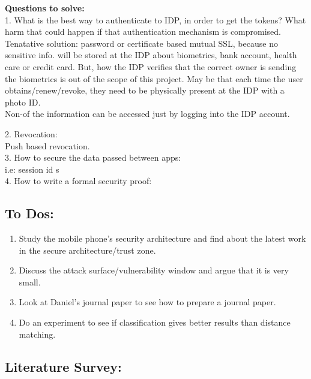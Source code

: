 \documentclass[11pt]{article}
\begin{document}
\textbf{Questions to solve:}\\
 1. What is the best way to authenticate to IDP, in order to get the tokens? What harm that could happen if that authentication mechanism is 
compromised.\\
Tenatative solution: password or certificate based mutual SSL, because no sensitive info. will be stored at the IDP about biometrics, bank account, 
health care or credit card. But, how the IDP verifies that the correct owner is sending the biometrics is out of the scope of this project.
May be that each time the user obtains/renew/revoke, they need to be physically present at the IDP with a photo ID. \\

Non-of the information can be accessed just by logging into the IDP account.

2. Revocation:\\
Push based revocation.\\

3. How to secure the data passed between apps:\\
i.e: session id s\\

4. How to write a formal security proof:\\


\pagebreak
\subsection*{To Dos:}
\begin{enumerate}
 \item Study the mobile phone's security architecture and find about the latest work in the secure architecture/trust zone.
 \item Discuss the attack surface/vulnerability window and argue that it is very small.
 \item Look at Daniel's journal paper to see how to prepare a journal paper.
 \item Do an experiment to see if classification gives better results than distance matching.
\end{enumerate}

\subsection*{Literature Survey:}
\end{document}
